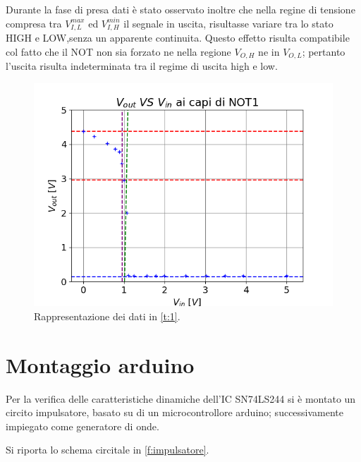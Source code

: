 	 Durante la fase di presa dati è stato osservato inoltre che nella regine di tensione compresa tra 	$V_{I,L}^{max}$ ed $V_{I,H}^{min}$ il segnale in uscita, risultasse variare tra lo stato HIGH e LOW,senza un apparente continuita.
	 Questo effetto risulta compatibile col fatto che il NOT non sia forzato ne nella regione $V_{O,H}$ ne in $V_{O,L}$; pertanto  l'uscita risulta indeterminata tra il regime di uscita high e low.
	\begin{center}
		\begin{figure}[h]
			\includegraphics[scale=0.50]{../Figs-Tabs/in-ot2.png}
			\caption{Rappresentazione dei dati in \tablename{ \ref{t:1}}.}
			\label{f:i1}
		\end{figure}
	\end{center}

	
\section{Montaggio arduino}
	Per la verifica delle caratteristiche dinamiche dell'IC SN74LS244 si è montato un circito impulsatore, basato su di un microcontrollore arduino; successivamente impiegato come generatore di onde. 
	
	Si riporta lo schema circitale in \figurename{ \ref{f:impulsatore}}. 
	
